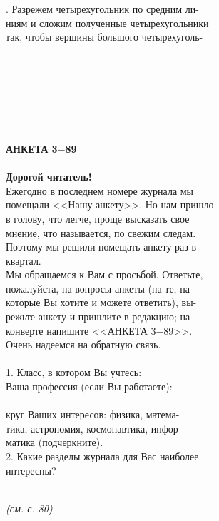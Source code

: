 . Разрежем четырехугольник по средним ли-\\
ниям и сложим полученные четырехугольники\\
так, чтобы вершины большого четырехуголь-\\ \\ \\ \\ \\ \\ \\ \\

\noindent\textbf{{\LARGE АНКЕТА 3$-$89}\\ \\
Дорогой читатель!}\\
Ежегодно в последнем номере журнала мы\\
помещали <<Нашу анкету>>. Но нам пришло\\
в голову, что легче, проще высказать свое\\
мнение, что называется, по свежим следам.\\
Поэтому мы решили помещать анкету раз в\\
квартал.\\
Мы обращаемся к Вам с просьбой. Ответьте,\\
пожалуйста, на вопросы анкеты (на те, на\\
которые Вы хотите и можете ответить), вы-\\
режьте анкету и пришлите в редакцию; на\\
конверте напишите <<АНКЕТА 3$-$89>>.\\
Очень надеемся на обратную связь.\\ \\
1. Класс, в котором Вы учтесь: \underline{\hspace{3cm}}\\
Ваша профессия (если Вы работаете): \underline{\hspace{2cm}}\\
\underline{\hspace{7.86cm}}\\
круг Ваших интересов: физика, матема-\\
тика, астрономия, космонавтика, инфор-\\
матика (подчеркните).\\
2. Какие разделы журнала для Вас наиболее\\
интересны? \underline{\hspace{6cm}}\\
\underline{\hspace{7.86cm}}\\

\begin{flushright}
\textit{(см. с. 80)\ \ \ \ \ \ \ }
\end{flushright}
